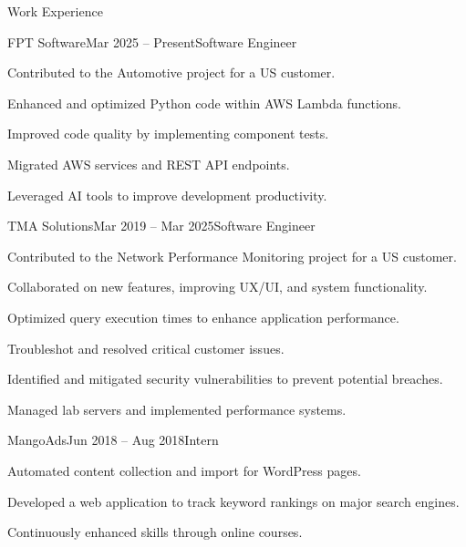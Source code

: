 \documentclass[12pt,a4paper]{cv}
\begin{document}
\begin{cvSection}{Work Experience}

	\begin{cvSubsection}{FPT Software}{Mar 2025 -- Present}{Software Engineer}
		\item Contributed to the Automotive project for a US customer.
		\item Enhanced and optimized Python code within AWS Lambda functions.
		\item Improved code quality by implementing component tests.
		\item Migrated AWS services and REST API endpoints.
		\item Leveraged AI tools to improve development productivity.
	\end{cvSubsection}


	\begin{cvSubsection}{TMA Solutions}{Mar 2019 -- Mar 2025}{Software Engineer}
		\item Contributed to the Network Performance Monitoring project for a US customer.
		\item Collaborated on new features, improving UX/UI, and system functionality.
		\item Optimized query execution times to enhance application performance.
		\item Troubleshot and resolved critical customer issues.
		\item Identified and mitigated security vulnerabilities to prevent potential breaches.
		\item Managed lab servers and implemented performance systems.
	\end{cvSubsection}


	\begin{cvSubsection}{MangoAds}{Jun 2018 -- Aug 2018}{Intern}
		\item Automated content collection and import for WordPress pages.
		\item Developed a web application to track keyword rankings on major search engines.
		\item Continuously enhanced skills through online courses.
	\end{cvSubsection}

\end{cvSection}
\end{document}
